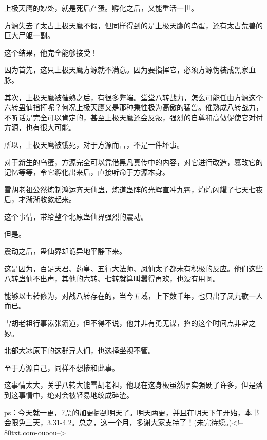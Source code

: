 \begin{this_body}
上极天鹰的妙处，就是死后产蛋。孵化之后，又能重活一世。

方源失去了太古上极天鹰不假，但同样得到的是上极天鹰的鸟蛋，还有太古荒兽的巨大尸躯一副。

这个结果，他完全能够接受！

因为首先，这只上极天鹰方源就不满意。因为要指挥它，必须方源伪装成黑家血脉。

其次，上极天鹰被催熟之后，有很多弊端。堂堂八转战力，怎么可能任由方源这个六转蛊仙指挥呢？何况上极天鹰又是那种秉性极为高傲的猛兽。催熟成八转战力，不听话是完全可以肯定的，甚至上极天鹰还会反叛，强烈的自尊和高傲促使它对付方源，也有很大可能。

所以，上极天鹰被饿死，对于方源而言，不是一件坏事。

对于新生的鸟蛋，方源完全可以凭借黑凡真传中的内容，对它进行改造，篡改它的记忆等等，令它孵化出来后，直接听命于方源本身。

雪胡老祖公然炼制鸿运齐天仙蛊，炼道蛊阵的光辉直冲九霄，灼灼闪耀了七天七夜后，才渐渐收敛起来。

这个事情，带给整个北原蛊仙界强烈的震动。

但是。

震动之后，蛊仙界却诡异地平静下来。

这是因为，百足天君、药皇、五行大法师、凤仙太子都未有积极的反应。他们这些八转蛊仙不出声，其他的六转、七转就算叫嚣得再欢，也没有用啊。

能够以七转修为，对战八转存在的，当今五域，上下数千年，也只出了凤九歌一人而已。

雪胡老祖行事嚣张霸道，但不得不说，他并非有勇无谋，掐的这个时间点非常之妙。

北部大冰原下的这群异人们，也选择坐视不管。

至于方源自己，同样不想掺和此事。

这事情太大，关乎八转大能雪胡老祖，他现在这身板虽然厚实强硬了许多，但是落到这事情中，绝对会被轻易地绞成碎渣。

ps：今天就一更，7票的加更挪到明天了。明天两更，并且在明天下午开始，本书会限免三天，3.31-4.2。总之，这一个月，多谢大家支持了！(未完待续。)<!--80txt.com-ouoou-->

\end{this_body}

